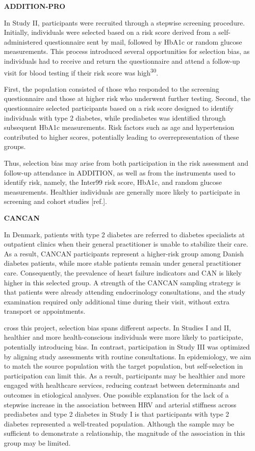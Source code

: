 \documentclass[
  a4paper,
  headsepline=true,
  open=any]{scrbook}
\begin{document}
\textbf{ADDITION-PRO}

In Study II, participants were recruited through a stepwise screening
procedure. Initially, individuals were selected based on a risk score
derived from a self-administered questionnaire sent by mail, followed by
HbA1c or random glucose measurements. This process introduced several
opportunities for selection bias, as individuals had to receive and
return the questionnaire and attend a follow-up visit for blood testing
if their risk score was high\textsuperscript{30}.

First, the population consisted of those who responded to the screening
questionnaire and those at higher risk who underwent further testing.
Second, the questionnaire selected participants based on a risk score
designed to identify individuals with type 2 diabetes, while prediabetes
was identified through subsequent HbA1c measurements. Risk factors such
as age and hypertension contributed to higher scores, potentially
leading to overrepresentation of these groups.

Thus, selection bias may arise from both participation in the risk
assessment and follow-up attendance in ADDITION, as well as from the
instruments used to identify risk, namely, the Inter99 risk score,
HbA1c, and random glucose measurements. Healthier individuals are
generally more likely to participate in screening and cohort studies
{[}ref.{]}.

\textbf{CANCAN}

In Denmark, patients with type 2 diabetes are referred to diabetes
specialists at outpatient clinics when their general practitioner is
unable to stabilize their care. As a result, CANCAN participants
represent a higher-risk group among Danish diabetes patients, while more
stable patients remain under general practitioner care. Consequently,
the prevalence of heart failure indicators and CAN is likely higher in
this selected group. A strength of the CANCAN sampling strategy is that
patients were already attending endocrinology consultations, and the
study examination required only additional time during their visit,
without extra transport or appointments.

cross this project, selection bias spans different aspects. In Studies I
and II, healthier and more health-conscious individuals were more likely
to participate, potentially introducing bias. In contrast, participation
in Study III was optimized by aligning study assessments with routine
consultations. In epidemiology, we aim to match the source population
with the target population, but self-selection in participation can
limit this. As a result, participants may be healthier and more engaged
with healthcare services, reducing contrast between determinants and
outcomes in etiological analyses. One possible explanation for the lack
of a stepwise increase in the association between HRV and arterial
stiffness across prediabetes and type 2 diabetes in Study I is that
participants with type 2 diabetes represented a well-treated population.
Although the sample may be sufficient to demonstrate a relationship, the
magnitude of the association in this group may be limited.
\end{document}
